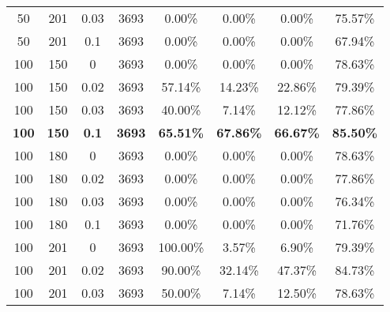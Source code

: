 \begin{table}[h]
{\begin{tabular}{cccccccc}
50                   & 201         & 0.03          & 3693         & 0.00\%             & 0.00\%          & 0.00\%      & 75.57\%           \\
50                   & 201         & 0.1           & 3693         & 0.00\%             & 0.00\%          & 0.00\%      & 67.94\%           \\
100                  & 150         & 0             & 3693         & 0.00\%             & 0.00\%          & 0.00\%      & 78.63\%           \\
100                  & 150         & 0.02          & 3693         & 57.14\%            & 14.23\%         & 22.86\%     & 79.39\%           \\
100                  & 150         & 0.03          & 3693         & 40.00\%            & 7.14\%          & 12.12\%     & 77.86\%           \\
\textcolor{customDarkRed}{\textbf{100}}                  & \textcolor{customDarkRed}{\textbf{150}}         & \textcolor{customDarkRed}{\textbf{0.1}   }        & \textcolor{customDarkRed}{\textbf{3693}}         & \textcolor{customDarkRed}{\textbf{65.51\%}}            & \textcolor{customDarkRed}{\textbf{67.86\%}}         & \textcolor{customDarkRed}{\textbf{66.67\%}}    & \textcolor{customDarkRed}{\textbf{85.50\%}}           \\
100                  & 180         & 0             & 3693         & 0.00\%             & 0.00\%          & 0.00\%      & 78.63\%           \\
100                  & 180         & 0.02          & 3693         & 0.00\%             & 0.00\%          & 0.00\%      & 77.86\%           \\
100                  & 180         & 0.03          & 3693         & 0.00\%             & 0.00\%          & 0.00\%      & 76.34\%           \\
100                  & 180         & 0.1           & 3693         & 0.00\%             & 0.00\%          & 0.00\%      & 71.76\%           \\
100                  & 201         & 0             & 3693         & 100.00\%           & 3.57\%          & 6.90\%      & 79.39\%           \\
100                  & 201         & 0.02          & 3693         & 90.00\%            & 32.14\%         & 47.37\%     & 84.73\%           \\
100                  & 201         & 0.03          & 3693         & 50.00\%            & 7.14\%          & 12.50\%     & 78.63\%           \\

\end{tabular}}
\end{table}
